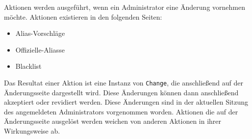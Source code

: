 Aktionen werden ausgeführt, wenn ein Administrator eine Änderung vornehmen möchte.
Aktionen existieren in den folgenden Seiten:

\begin{itemize}
    \item Alias-Vorschläge
    \item Offizielle-Aliasse
    \item Blacklist
\end{itemize}

Das Resultat einer Aktion ist eine Instanz von \verb#Change#, die anschließend auf der Änderungsseite dargestellt wird.
Diese Änderungen können dann anschließend akzeptiert oder revidiert werden.
Diese Änderungen sind in der aktuellen Sitzung des angemeldeten Administrators vorgenommen worden.
Aktionen die auf der Änderungsseite ausgelöst werden weichen von anderen Aktionen in ihrer Wirkungsweise ab.